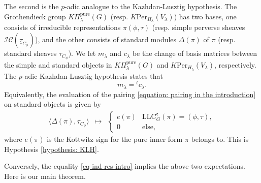 \documentclass[11pt,letterpaper]{amsart}
\newcommand{\GL}{\mathrm{GL}}
\newcommand{\pure}{\mathrm{pure}}
\newcommand{\LLC}{\mathrm{LLC}}
\newcommand{\Per}{\mathrm{Per}}
\newcommand{\locsys}[2]{\underline{#1}_{#2}}
\newcommand{\stsh}[2]{{#1}_{#2}}
\renewcommand{\1}{\mathbbm{1}}
\numberwithin{equation}{section}
\begin{document}
The second is the $p$-adic analogue to the Kazhdan-Lusztig hypothesis. The Grothendieck group $K\Pi_\lambda^\pure(G)$ (resp. $K\Per_{H_\lambda}(V_\lambda)$) has two bases, one consists of irreducible representations $\pi(\phi,\tau)$ (resp. simple perverse sheaves $\mathcal{IC}(\locsys{\tau}{C_\phi})$), and the other consists of standard modules $\Delta(\pi)$ of $\pi$ (resp. standard sheaves $\stsh{\tau}{C_{\phi}}$). We let $m_{\lambda}$ and $c_{\lambda}$ be the change of basis matrices between the simple and standard objects in $K\Pi_\lambda^\pure(G)$ and $K\Per_{H_\lambda}(V_\lambda)$, respectively. The $p$-adic Kazhdan-Lusztig hypothesis states that 
\[ m_{\lambda}= {}^tc_{\lambda}.\]
Equivalently, the evaluation of the pairing \eqref{equation: pairing in the introduction} on standard objects is given by 
\begin{equation}\label{equation: pairing on standards in the introduction}
    \begin{array}{rcl}
        \langle \Delta(\pi), \stsh{\tau}{C_{\phi}} \rangle 
            &\mapsto& 
            \begin{cases}
                e(\pi) & \LLC^{\mathfrak{e}}_G(\pi) = (\phi,\tau), \\
                0 & \text{else},
            \end{cases}
    \end{array}
\end{equation}
where $e(\pi)$ is the Kottwitz sign for the pure inner form $\pi$ belongs to. This is Hypothesis \ref{hypothesis: KLH}.


Conversely, the equality \eqref{eq ind res intro} implies the above two expectations. Here is our main theorem.
\end{document}
